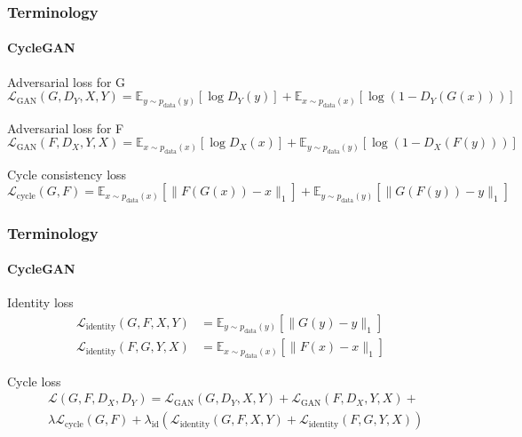 \documentclass[aspectratio=169, lecture, amberg]{OTHAWbeamer}
\begin{document}
\begin{frame}
    \frametitle{Terminology}
    \framesubtitle{CycleGAN}
    \begin{block}{Adversarial loss for G}
        \begin{equation}
            \mathcal{L}_{\text{GAN}}(G, D_Y, X, Y) = \mathbb{E}_{y \sim p_{\text{data}}(y)} [\log D_Y(y)] + \mathbb{E}_{x \sim p_{\text{data}}(x)} [\log(1 - D_Y(G(x)))]
        \end{equation}
    \end{block}

    \begin{block}{Adversarial loss for F}
        \begin{equation}
            \mathcal{L}_{\text{GAN}}(F, D_X, Y, X) = \mathbb{E}_{x \sim p_{\text{data}}(x)} [\log D_X(x)] + \mathbb{E}_{y \sim p_{\text{data}}(y)} [\log(1 - D_X(F(y)))]
        \end{equation}
    \end{block}

    \begin{block}{Cycle consistency loss}
        \begin{equation}
        \mathcal{L}_{\text{cycle}}(G, F) = \mathbb{E}_{x \sim p_{\text{data}}(x)} [\lVert F(G(x)) - x \rVert_1] + \mathbb{E}_{y \sim p_{\text{data}}(y)} [\lVert G(F(y)) - y \rVert_1]
        \end{equation}
    \end{block}
\end{frame}

\begin{frame}
    \frametitle{Terminology}
    \framesubtitle{CycleGAN}
    \begin{block}{Identity loss}
        \begin{align}
            \mathcal{L}_{\text{identity}}(G, F, X, Y) & = \mathbb{E}_{y \sim p_{\text{data}}(y)} [\lVert G(y) - y \rVert_1] \\
            \mathcal{L}_{\text{identity}}(F, G, Y, X) & = \mathbb{E}_{x \sim p_{\text{data}}(x)} [\lVert F(x) - x \rVert_1]
        \end{align}
    \end{block}

    \begin{block}{Cycle loss}
        \begin{equation}
            \begin{split}
                &\mathcal{L}(G, F, D_X, D_Y) = \mathcal{L}_{\text{GAN}}(G, D_Y, X, Y) + \mathcal{L}_{\text{GAN}}(F, D_X, Y, X) + \\
                &\lambda \mathcal{L}_{\text{cycle}}(G, F) + \lambda_{\text{id}} \left( \mathcal{L}_{\text{identity}}(G, F, X, Y) + \mathcal{L}_{\text{identity}}(F, G, Y, X) \right)
            \end{split}    
        \end{equation}
    \end{block}
\end{frame}
\end{document}
